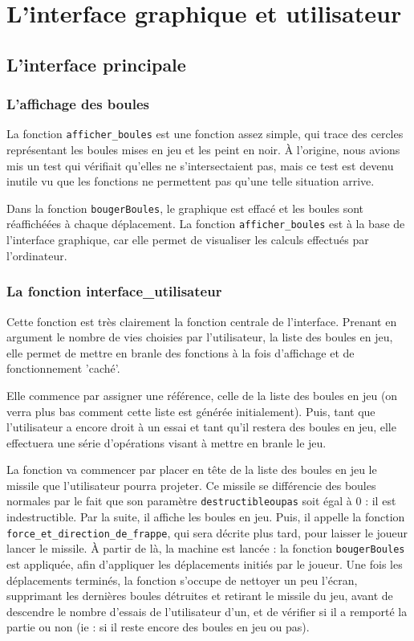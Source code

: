 \documentclass[10pt]{article}
\begin{document}
\section{L'interface graphique et utilisateur}


\subsection{L'interface principale}
\subsubsection{L'affichage des boules}
La fonction \texttt{afficher\_boules} est une fonction assez simple, qui trace des cercles représentant les boules mises en jeu et les peint en noir. À l'origine,
nous avions mis un test qui vérifiait qu'elles ne s'intersectaient pas, mais ce test est devenu inutile vu que les fonctions ne permettent pas qu'une telle
situation arrive.
\par Dans la fonction \texttt{bougerBoules}, le graphique est effacé et les boules sont réaffichéées à chaque déplacement. La fonction
\texttt{afficher\_boules} est à la base de l'interface graphique, car elle permet de visualiser les calculs effectués par l'ordinateur.
\subsubsection{La fonction interface\_utilisateur}
Cette fonction est très clairement la fonction centrale de l'interface. Prenant en argument le nombre de vies choisies par l'utilisateur,
la liste des boules en jeu, elle permet de mettre en branle des fonctions à la fois d'affichage et de fonctionnement 'caché'.
\par Elle commence par assigner une référence, celle de la liste des boules en jeu (on verra plus bas comment cette liste est générée initialement).
Puis, tant que l'utilisateur a encore droit à un essai et tant qu'il restera des boules en jeu, elle effectuera une série d'opérations
visant à mettre en branle le jeu.
\par La fonction va commencer par placer en tête de la liste des boules en jeu le missile que l'utilisateur pourra projeter. Ce missile
se différencie des boules normales par le fait que son paramètre \texttt{destructibleoupas} soit égal à 0 : il est indestructible. Par
la suite, il affiche les boules en jeu. Puis, il appelle la fonction \texttt{force\_et\_direction\_de\_frappe}, qui sera décrite plus tard,
pour laisser le joueur lancer le missile. À partir de là, la machine est lancée : la fonction \texttt{bougerBoules} est appliquée, afin
d'appliquer les déplacements initiés par le joueur. Une fois les déplacements terminés, la fonction s'occupe de nettoyer un peu l'écran,
supprimant les dernières boules détruites et retirant le missile du jeu, avant de descendre le nombre d'essais de l'utilisateur d'un, et
de vérifier si il a remporté la partie ou non (ie : si il reste encore des boules en jeu ou pas).
\end{document}
